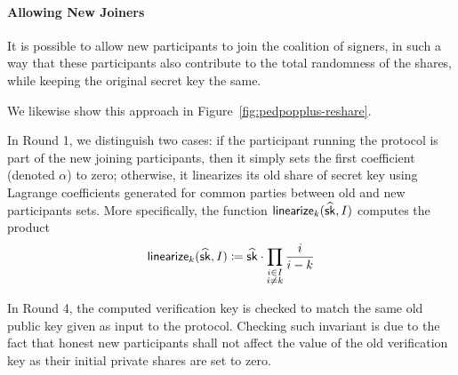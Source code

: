 \paragraph{Allowing New Joiners}
It is possible to allow new participants to join the coalition of signers,
in such a way that these participants also contribute to the total randomness of the shares,
while keeping the original secret key the same.

We likewise show this approach in Figure~\ref{fig:pedpopplus-reshare}.

In Round 1, we distinguish two cases: if the participant running the protocol is part of the new joining participants, then it simply sets the first coefficient (denoted $\alpha$) to zero; otherwise, it linearizes its old share of secret key using
Lagrange coefficients generated for common parties between old and new participants sets.
More specifically, the function $\mathsf{linearize}_k(\widehat{\mathsf{sk}}, I)$ computes the product
\[
\mathsf{linearize}_k(\widehat{\mathsf{sk}}, I)\coloneqq \widehat{\mathsf{sk}} \cdot \prod_{\substack{i\in I\\ i\neq k}} \frac{i}{i-k}
\]

In Round 4, the computed verification key is checked to match the same old public key given as input to the protocol.
Checking such invariant is due to the fact that honest new participants shall not affect the value of the old verification key as their initial private shares are set to zero.

